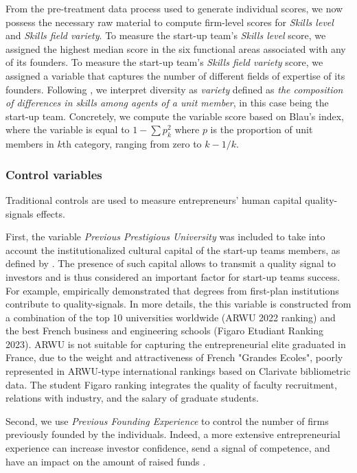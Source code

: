 \documentclass[12pt]{article}
\begin{document}
From the pre-treatment data process used to generate individual scores, we now possess the necessary raw material to compute firm-level scores for \textit{Skills level} and \textit{Skills field variety}. To measure the start-up team's \textit{Skills level} score, we assigned the highest median score in the six functional areas associated with any of its founders. To measure the start-up team's \textit{Skills field variety} score, we assigned a variable that captures the number of different fields of expertise of its founders. Following \citet{harrison2007s}, we interpret diversity as \textit{variety} defined as \textit{the composition of differences in skills among agents of a unit member}, in this case being the start-up team. Concretely, we compute the variable score based on Blau's index, where the variable is equal to $1-\sum p_k^2$ where $p$ is the proportion of unit members in $k$th category, ranging from zero to $k-1/k$.

\subsubsection{Control variables}

Traditional controls are used to measure entrepreneurs' human capital quality-signals effects.

First, the variable \textit{Previous Prestigious University} was included to take into account the institutionalized cultural capital of the start-up teams members, as defined by \citet{bourdieu1979distinction}. The presence of such capital allows to transmit a quality signal to investors and is thus considered an important factor for start-up teams success. For example, \citet{ferrary1999confiance} empirically demonstrated that degrees from first-plan institutions contribute to quality-signals. In more details, the this variable is constructed from a combination of the top 10 universities worldwide (ARWU 2022 ranking) and the best French business and engineering schools (Figaro Etudiant Ranking 2023). ARWU is not suitable for capturing the entrepreneurial elite graduated in France, due to the weight and attractiveness of French "Grandes Ecoles", poorly represented in ARWU-type international rankings based on Clarivate bibliometric data. The student Figaro ranking integrates the quality of faculty recruitment, relations with industry, and the salary of graduate students.

Second, we use \textit{Previous Founding Experience} to control the number of firms previously founded by the individuals. Indeed, a more extensive entrepreneurial experience can increase investor confidence, send a signal of competence, and have an impact on the amount of raised funds \citep{hsu2007experienced}.
\end{document}
